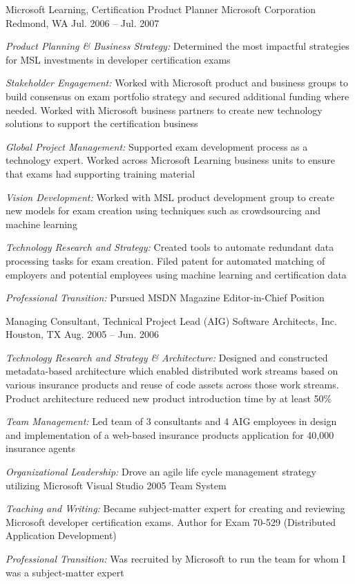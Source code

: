 \begin{cventries}
\cventry 
{Microsoft Learning, Certification Product Planner}
{Microsoft Corporation}
{Redmond, WA}
{Jul. 2006 – Jul. 2007}
{ %
\begin{cvitems}
\item {\emph{Product Planning \& Business Strategy:} Determined the most impactful strategies for MSL investments in developer certification exams }
\item {\emph{Stakeholder Engagement:} Worked with Microsoft product and business groups to build consensus on exam portfolio strategy and secured additional funding where needed. Worked with Microsoft business partners to create new technology solutions to support the certification business }
\item {\emph{Global Project Management:} Supported exam development process as a technology expert. Worked across Microsoft Learning business units to ensure that exams had supporting training material }
\item {\emph{Vision Development:} Worked with MSL product development group to create new models for exam creation using techniques such as crowdsourcing and machine learning }
\item {\emph{Technology Research and Strategy:} Created tools to automate redundant data processing tasks for exam creation. Filed patent for automated matching of employers and potential employees using machine learning and certification data }
\item {\emph{Professional Transition:} Pursued MSDN Magazine Editor-in-Chief Position }
\end{cvitems}
}


\cventry 
{Managing Consultant, Technical Project Lead (AIG)}
{Software Architects, Inc.}
{Houston, TX}
{Aug. 2005 – Jun. 2006}
{ %
\begin{cvitems}
\item {\emph{Technology Research and Strategy \& Architecture:} Designed and constructed metadata-based architecture which enabled distributed work streams based on various insurance products and reuse of code assets across those work streams. Product architecture reduced new product introduction time by at least 50\% }
\item {\emph{Team Management:} Led team of 3 consultants and 4 AIG employees in design and implementation of a web-based insurance products application for 40,000 insurance agents }
\item {\emph{Organizational Leadership:} Drove an agile life cycle management strategy utilizing Microsoft Visual Studio 2005 Team System }
\item {\emph{Teaching and Writing:} Became subject-matter expert for creating and reviewing Microsoft developer certification exams. Author for Exam 70-529 (Distributed Application Development) }
\item {\emph{Professional Transition:} Was recruited by Microsoft to run the team for whom I was a subject-matter expert }
\end{cvitems}
}


\end{cventries}
